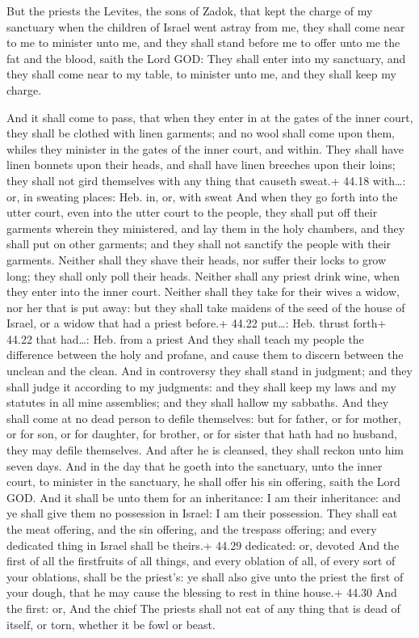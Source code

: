  But the priests the Levites, the sons of Zadok, that
kept the charge of my sanctuary when the children of Israel went astray
from me, they shall come near to me to minister unto me, and they shall
stand before me to offer unto me the fat and the blood, saith the Lord
GOD:  They shall enter into my sanctuary, and they shall
come near to my table, to minister unto me, and they shall keep my
charge.

 And it shall come to pass, that when they enter in at
the gates of the inner court, they shall be clothed with linen garments;
and no wool shall come upon them, whiles they minister in the gates of
the inner court, and within.  They shall have linen bonnets
upon their heads, and shall have linen breeches upon their loins; they
shall not gird themselves with any thing that causeth sweat.+ 44.18
with\ldots: or, in sweating places: Heb. in, or, with sweat
 And when they go forth into the utter court, even into the
utter court to the people, they shall put off their garments wherein
they ministered, and lay them in the holy chambers, and they shall put
on other garments; and they shall not sanctify the people with their
garments.  Neither shall they shave their heads, nor suffer
their locks to grow long; they shall only poll their heads.
 Neither shall any priest drink wine, when they enter into
the inner court.  Neither shall they take for their wives a
widow, nor her that is put away: but they shall take maidens of the seed
of the house of Israel, or a widow that had a priest before.+ 44.22
put\ldots: Heb. thrust forth+ 44.22 that had\ldots: Heb. from a priest
 And they shall teach my people the difference between the
holy and profane, and cause them to discern between the unclean and the
clean.  And in controversy they shall stand in judgment;
and they shall judge it according to my judgments: and they shall keep
my laws and my statutes in all mine assemblies; and they shall hallow my
sabbaths.  And they shall come at no dead person to defile
themselves: but for father, or for mother, or for son, or for daughter,
for brother, or for sister that hath had no husband, they may defile
themselves.  And after he is cleansed, they shall reckon
unto him seven days.  And in the day that he goeth into the
sanctuary, unto the inner court, to minister in the sanctuary, he shall
offer his sin offering, saith the Lord GOD.  And it shall
be unto them for an inheritance: I am their inheritance: and ye shall
give them no possession in Israel: I am their possession. 
They shall eat the meat offering, and the sin offering, and the trespass
offering; and every dedicated thing in Israel shall be theirs.+ 44.29
dedicated: or, devoted  And the first of all the
firstfruits of all things, and every oblation of all, of every sort of
your oblations, shall be the priest's: ye shall also give unto the
priest the first of your dough, that he may cause the blessing to rest
in thine house.+ 44.30 And the first: or, And the chief 
The priests shall not eat of any thing that is dead of itself, or torn,
whether it be fowl or beast.


